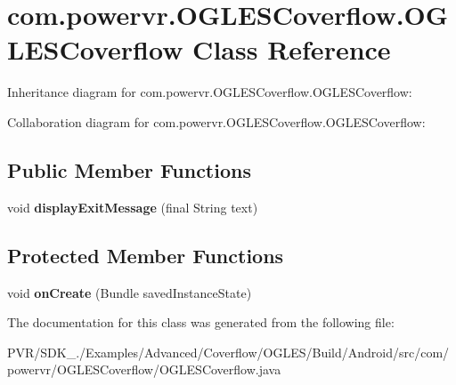 \hypertarget{classcom_1_1powervr_1_1_o_g_l_e_s_coverflow_1_1_o_g_l_e_s_coverflow}{\section{com.\+powervr.\+O\+G\+L\+E\+S\+Coverflow.\+O\+G\+L\+E\+S\+Coverflow Class Reference}
\label{classcom_1_1powervr_1_1_o_g_l_e_s_coverflow_1_1_o_g_l_e_s_coverflow}
}


Inheritance diagram for com.\+powervr.\+O\+G\+L\+E\+S\+Coverflow.\+O\+G\+L\+E\+S\+Coverflow\+:


Collaboration diagram for com.\+powervr.\+O\+G\+L\+E\+S\+Coverflow.\+O\+G\+L\+E\+S\+Coverflow\+:
\subsection*{Public Member Functions}
\begin{DoxyCompactItemize}
\item 
\hypertarget{classcom_1_1powervr_1_1_o_g_l_e_s_coverflow_1_1_o_g_l_e_s_coverflow_a7925ff7789507acfe3107663c070647f}{void {\bfseries display\+Exit\+Message} (final String text)}\label{classcom_1_1powervr_1_1_o_g_l_e_s_coverflow_1_1_o_g_l_e_s_coverflow_a7925ff7789507acfe3107663c070647f}

\end{DoxyCompactItemize}
\subsection*{Protected Member Functions}
\begin{DoxyCompactItemize}
\item 
\hypertarget{classcom_1_1powervr_1_1_o_g_l_e_s_coverflow_1_1_o_g_l_e_s_coverflow_a5f78fec22f8d7ce32a723a11644c2131}{void {\bfseries on\+Create} (Bundle saved\+Instance\+State)}\label{classcom_1_1powervr_1_1_o_g_l_e_s_coverflow_1_1_o_g_l_e_s_coverflow_a5f78fec22f8d7ce32a723a11644c2131}

\end{DoxyCompactItemize}


The documentation for this class was generated from the following file\+:\begin{DoxyCompactItemize}
\item 
P\+V\+R/\+S\+D\+K\+\_./\+Examples/\+Advanced/\+Coverflow/\+O\+G\+L\+E\+S/\+Build/\+Android/src/com/powervr/\+O\+G\+L\+E\+S\+Coverflow/O\+G\+L\+E\+S\+Coverflow.\+java\end{DoxyCompactItemize}
